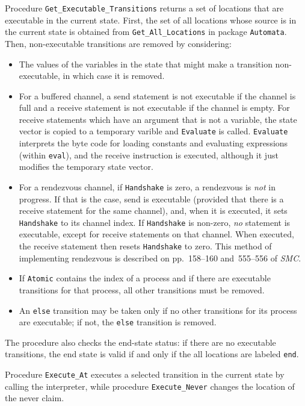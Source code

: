 \documentclass[11pt]{article}
\newcommand*{\smc}{\textit{SMC}}
\newcommand*{\p}[1]{\texttt{#1}}
\begin{document}
Procedure \p{Get\_Executable\_Transitions} returns a set of locations
that are executable in the current state. First, the set of all
locations whose source is in the current state is obtained from
\p{Get\_All\_Locations} in package \p{Automata}. Then, non-executable
transitions are removed by considering:

\begin{itemize}

\item The values of the variables in the state that might make a
transition non-executable, in which case it is removed.

\item For a buffered channel, a send statement is not executable if the
channel is full and a receive statement is not executable if the channel
is empty. For receive statements which have an argument that is not a
variable, the state vector is copied to a temporary varible and
\p{Evaluate} is called. \p{Evaluate} interprets the byte code for
loading constants and evaluating expressions (within \p{eval}), and the
receive instruction is executed, although it just modifies the temporary
state vector.

\item For a rendezvous channel, if \p{Handshake} is zero, a rendezvous
is \emph{not} in progress. If that is the case, send is executable
(provided that there is a receive statement for the same channel), and,
when it is executed, it sets \p{Handshake} to its channel index. If
\p{Handshake} is non-zero, \emph{no} statement is executable, except for
receive statements on that channel. When executed, the receive statement
then resets \p{Handshake} to zero. This method of implementing rendezvous
is described on pp.~158--160 and~555--556 of \smc{}.

\item If \p{Atomic} contains the index of a process and if there are
executable transitions for that process, all other transitions must be
removed.

\item An \p{else} transition may be taken only if no other transitions
for its process are executable; if not, the \p{else} transition is
removed.

\end{itemize}
The procedure also checks the end-state status: if there are no
executable transitions, the end state is valid if and only if the all
locations are labeled \p{end}.

Procedure \p{Execute\_At} executes a selected transition in the current
state by calling the interpreter, while procedure \p{Execute\_Never}
changes the location of the never claim.
\end{document}
